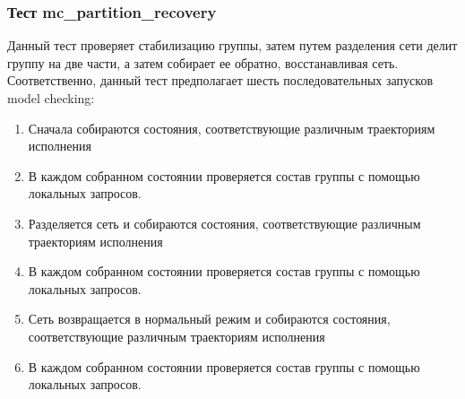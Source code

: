 \documentclass[a4paper,12pt]{extarticle}
\newcommand{\goal}[0]{\texttt{Goal}}
\newcommand{\prune}[0]{\texttt{Prune}}
\newcommand{\invariant}[0]{\texttt{Invariant}}
\newcommand{\collect}[0]{\texttt{Collect}}
\newcommand{\mc}[0]{MC}
\begin{document}


\subsubsection{Тест mc\_partition\_recovery}

Данный тест проверяет стабилизацию группы, затем путем разделения сети делит группу на две части, а затем собирает ее обратно, восстанавливая сеть.
Соответственно, данный тест предполагает шесть последовательных запусков model checking:

\begin{enumerate}
    \item Сначала собираются состояния, соответствующие различным траекториям исполнения
    \item В каждом собранном состоянии проверяется состав группы с помощью локальных запросов.
    \item Разделяется сеть и собираются состояния, соответствующие различным траекториям исполнения
    \item В каждом собранном состоянии проверяется состав группы с помощью локальных запросов.
    \item Сеть возвращается в нормальный режим и собираются состояния, соответствующие различным траекториям исполнения
    \item В каждом собранном состоянии проверяется состав группы с помощью локальных запросов.
\end{enumerate}
\end{document}
